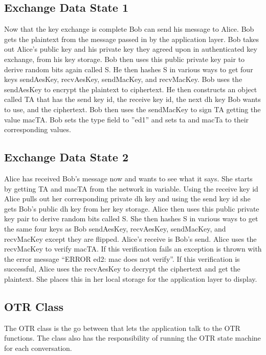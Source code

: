 \subsection{Exchange Data State 1}


Now that the key exchange is complete Bob can send his message to Alice. Bob gets the plaintext from the message passed in by the application layer. Bob takes out Alice’s public key and his private key they agreed upon in authenticated key exchange, from his key storage. Bob then uses this public private key pair to derive random bits again called S. He then hashes S in various ways to get four keys sendAesKey, recvAesKey, sendMacKey, and recvMacKey. Bob uses the sendAesKey to encrypt the plaintext to ciphertext. He then constructs an object called TA that has the send key id, the receive key id, the next dh key Bob wants to use, and the ciphertext. Bob then uses the sendMacKey to sign TA getting the value macTA. Bob sets the type field to ”ed1” and sets ta and macTa to their corresponding values.
 
\subsection{Exchange Data State 2}


Alice has received Bob’s message now and wants to see what it says. She starts by getting TA and macTA from the network in variable. Using the receive key id Alice pulls out her corresponding private dh key and using the send key id she gets Bob’s public dh key from her key storage. Alice then uses this public private key pair to derive random bits called S. She then hashes S in various ways to get the same four keys as Bob sendAesKey, recvAesKey, sendMacKey, and recvMacKey except they are flipped. Alice’s receive is Bob’s send. Alice uses the recvMacKey to verify macTA. If this verification fails an exception is thrown with the error message “ERROR ed2: mac does not verify”. If this verification is successful, Alice uses the recvAesKey to decrypt the ciphertext and get the plaintext. She places this in her local storage for the application layer to display.


\subsection{OTR Class}


The OTR class is the go between that lets the application talk to the OTR functions. The class also has the responsibility of running the OTR state machine for each conversation. 


